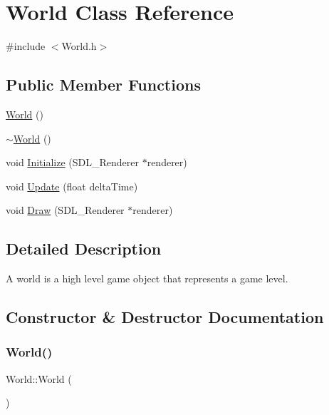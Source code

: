 \hypertarget{class_world}{}\section{World Class Reference}
\label{class_world}


{\ttfamily \#include $<$World.\+h$>$}

\subsection*{Public Member Functions}
\begin{DoxyCompactItemize}
\item 
\mbox{\hyperlink{class_world_afa39d4e6f714a7a3691ac0c656f5e8a8}{World}} ()
\item 
\mbox{\hyperlink{class_world_a8c73fba541a5817fff65147ba47cd827}{$\sim$\+World}} ()
\item 
void \mbox{\hyperlink{class_world_a72d413fcf9f301d1e2613844fd60f058}{Initialize}} (S\+D\+L\+\_\+\+Renderer $\ast$renderer)
\item 
void \mbox{\hyperlink{class_world_afdb5329b573ec0d74ba38e4641977705}{Update}} (float delta\+Time)
\item 
void \mbox{\hyperlink{class_world_ac42466df32c2d68dc36c41b3e1e9cdad}{Draw}} (S\+D\+L\+\_\+\+Renderer $\ast$renderer)
\end{DoxyCompactItemize}


\subsection{Detailed Description}
A world is a high level game object that represents a game level. 

\subsection{Constructor \& Destructor Documentation}
\mbox{\label{class_world_afa39d4e6f714a7a3691ac0c656f5e8a8}} 
\subsubsection{\texorpdfstring{World()}{World()}}
{\footnotesize\ttfamily World\+::\+World (\begin{DoxyParamCaption}{ }\end{DoxyParamCaption})}

